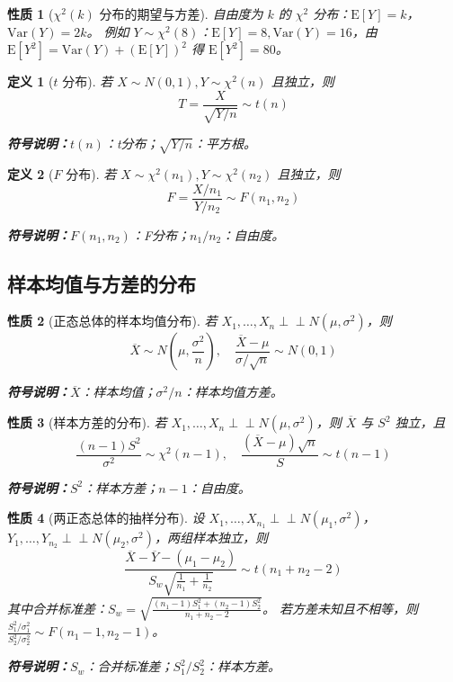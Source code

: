 \documentclass{article}
\newcommand{\E}{\mathrm{E}}
\newcommand{\D}{\mathrm{Var}}
\newcommand{\indep}{\perp \!\!\! \perp}
\newcommand{\samplemean}[1]{\overline{#1}}
\newcommand{\samplevar}[1]{S_{#1}^2}
\newcommand{\symnote}[1]{\par\noindent\textbf{符号说明：}#1\par}
\theoremstyle{mytheorem}
\newtheorem{definition}{定义}[section]
\newtheorem{property}{性质}[section]
\begin{document}
\begin{property}[$\chi^2(k)$ 分布的期望与方差]
自由度为 $k$ 的 $\chi^2$ 分布：$\E[Y] = k$，$\D(Y) = 2k$。
例如 $Y \sim \chi^2(8)$：$\E[Y] = 8, \D(Y) = 16$，由 $\E[Y^2] = \D(Y) + (\E[Y])^2$ 得 $\E[Y^2] = 80$。
\end{property}

\begin{definition}[$t$ 分布]
若 $X \sim N(0,1), Y \sim \chi^2(n)$ 且独立，则
$$
T = \frac{X}{\sqrt{Y/n}} \sim t(n)
$$
\symnote{$t(n)$：t分布；$\sqrt{Y/n}$：平方根。}
\end{definition}

\begin{definition}[$F$ 分布]
若 $X \sim \chi^2(n_1), Y \sim \chi^2(n_2)$ 且独立，则
$$
F = \frac{X/n_1}{Y/n_2} \sim F(n_1, n_2)
$$
\symnote{$F(n_1,n_2)$：F分布；$n_1/n_2$：自由度。}
\end{definition}

\subsection{样本均值与方差的分布}
\begin{property}[正态总体的样本均值分布]
若 $X_1,\dots,X_n \indep N(\mu,\sigma^2)$，则
$$
\samplemean{X} \sim N\left(\mu, \frac{\sigma^2}{n}\right), \quad \frac{\samplemean{X} - \mu}{\sigma/\sqrt{n}} \sim N(0,1)
$$
\symnote{$\samplemean{X}$：样本均值；$\sigma^2/n$：样本均值方差。}
\end{property}

\begin{property}[样本方差的分布]
若 $X_1,\dots,X_n \indep N(\mu,\sigma^2)$，则 $\samplemean{X}$ 与 $S^2$ 独立，且
$$
\frac{(n-1)S^2}{\sigma^2} \sim \chi^2(n-1), \quad \frac{(\samplemean{X} - \mu)\sqrt{n}}{S} \sim t(n-1)
$$
\symnote{$S^2$：样本方差；$n-1$：自由度。}
\end{property}

\begin{property}[两正态总体的抽样分布]
设 $X_1,\dots,X_{n_1} \indep N(\mu_1,\sigma^2)$，$Y_1,\dots,Y_{n_2} \indep N(\mu_2,\sigma^2)$，两组样本独立，则
$$
\frac{\samplemean{X} - \samplemean{Y} - (\mu_1 - \mu_2)}{S_w \sqrt{\frac{1}{n_1} + \frac{1}{n_2}}} \sim t(n_1 + n_2 - 2)
$$
其中合并标准差：$S_w = \sqrt{\frac{(n_1-1)\samplevar{1} + (n_2-1)\samplevar{2}}{n_1 + n_2 - 2}}$。
若方差未知且不相等，则 $\frac{\samplevar{1}/\sigma_1^2}{\samplevar{2}/\sigma_2^2} \sim F(n_1-1, n_2-1)$。
\symnote{$S_w$：合并标准差；$\samplevar{1}/\samplevar{2}$：样本方差。}
\end{property}
\end{document}
